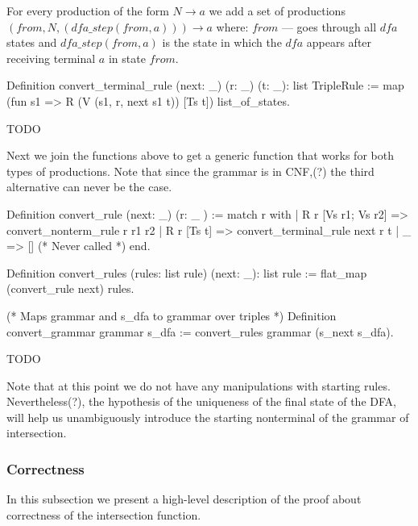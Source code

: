 For every production of the form $N \to a$ we add a set of productions $(from, N, (dfa\_step(from, a))) \to a$ where: $from$ --- goes through all $dfa$ states and $dfa\_step (from, a)$ is the state in which the $dfa$ appears after receiving terminal $a$ in state $from$.

\begin{listing}[h]
    \begin{pyglist}[language=coq, numbers=none, numbersep=5pt]
  Definition convert_terminal_rule 
              (next: _) 
              (r: _) 
              (t: _): list TripleRule :=
    map (fun s1 => R (V (s1, r, next s1 t)) 
	               [Ts t]) 
        list_of_states.
    \end{pyglist}
    \caption{TODO}
    \label{lst:verbments1}
\end{listing}

Next we join the functions above to get a generic function that works for both types of productions. Note that since the grammar is in CNF,(?) the third alternative can never be the case.

\begin{listing}[h]
    \begin{pyglist}[language=coq, numbers=none, numbersep=5pt]
  Definition convert_rule (next: _) (r: _ ) :=
    match r with
    | R r [Vs r1; Vs r2] => 
        convert_nonterm_rule r r1 r2
    | R r [Ts t] => 
        convert_terminal_rule next r t 
    | _  => []   (* Never called *)
    end.
        
  Definition convert_rules 
    (rules: list rule) (next: _): list rule :=
    flat_map (convert_rule next) rules.
    
  (* Maps grammar and s_dfa to grammar over triples *)
  Definition convert_grammar grammar s_dfa :=
    convert_rules grammar (s_next s_dfa). 
    \end{pyglist}
    \caption{TODO}
    \label{lst:verbments1}
\end{listing}

Note that at this point we do not have any manipulations with starting rules. Nevertheless(?), the hypothesis of the uniqueness of the final state of the DFA, will help us unambiguously introduce the starting nonterminal of the grammar of intersection.

\subsubsection{Correctness}

In this subsection we present a high-level description of the proof about correctness of the intersection function.

